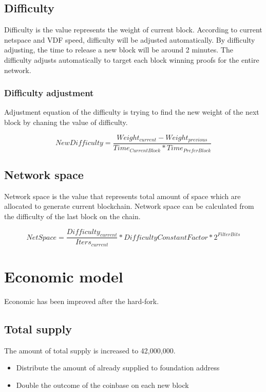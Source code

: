 \subsection{Difficulty}
\begin{flushleft}
    Difficulty is the value represents the weight of current block. According to current netspace and VDF speed, difficulty will be adjusted automatically. By difficulty adjusting, the time to release a new block will be around 2 minutes. The difficulty adjusts automatically to target each block winning proofs for the entire network.
\end{flushleft}
\subsubsection{Difficulty adjustment}
\begin{flushleft}
    Adjustment equation of the difficulty is trying to find the new weight of the next block by chaning the value of difficulty.
\end{flushleft}
\begin{equation}
    NewDifficulty = \frac{Weight_{current} - Weight_{previous}}{Time_{CurrentBlock} * Time_{PreferBlock}}
\end{equation}
\subsection{Network space}
\begin{flushleft}
    Network space is the value that represents total amount of space which are allocated to generate current blockchain. Network space can be calculated from the difficulty of the last block on the chain.
\end{flushleft}
\begin{equation}
    NetSpace = \frac{Difficulty_{current}}{Iters_{current}}*{DifficultyConstantFactor}*2^{FilterBits}
\end{equation}
\section{Economic model}
\begin{flushleft}
    Economic has been improved after the hard-fork.
\end{flushleft}
\subsection{Total supply}
\begin{flushleft}
    The amount of total supply is increased to 42,000,000.
\end{flushleft}
\begin{itemize}
    \item Distribute the amount of already supplied to foundation address
    \item Double the outcome of the coinbase on each new block
\end{itemize}

